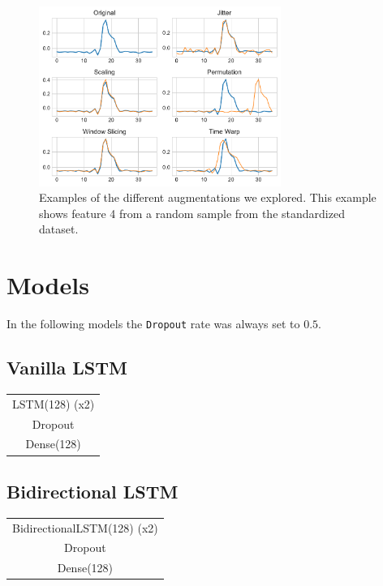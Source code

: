 \documentclass[conference,compsoc,11pt]{IEEEtran}
\begin{document}
\begin{figure}[h!]
\centering
\includegraphics[width=3.1in]{augmentation_vis.pdf}
\caption{Examples of the different augmentations we explored. This example shows feature 4 from a random sample from the standardized dataset.}
\label{fig:augmentation}
\end{figure}

\section{Models}

In the following models the \texttt{Dropout} rate was always set to $0.5$.

\subsection{Vanilla LSTM}\label{sec:features-extractor}

\begin{center}
\begin{tabular}{c}
\hline
LSTM(128) (x2)\\
Dropout\\
Dense(128)\\
\hline
\end{tabular}
\end{center}

\subsection{Bidirectional LSTM}

\begin{center}
\begin{tabular}{c}
\hline
BidirectionalLSTM(128) (x2)\\
Dropout\\
Dense(128)\\
\hline
\end{tabular}
\end{center}
\end{document}
